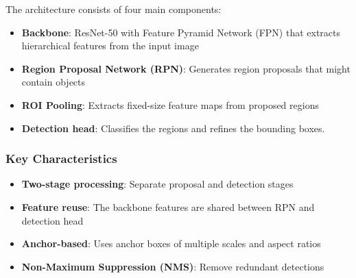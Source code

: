\documentclass[12pt,a4paper]{article}
\begin{document}
The architecture consists of four main components:
\begin{itemize}
    \item \textbf{Backbone}: ResNet-50 with Feature Pyramid Network (FPN) that extracts hierarchical features from the input image
    \item \textbf{Region Proposal Network (RPN)}: Generates region proposals that might contain objects
    \item \textbf{ROI Pooling}: Extracts fixed-size feature maps from proposed regions
    \item \textbf{Detection head}: Classifies the regions and refines the bounding boxes.
\end{itemize}

\subsubsection{Key Characteristics}
\begin{itemize}
    \item \textbf{Two-stage processing}: Separate proposal and detection stages
    \item \textbf{Feature reuse}: The backbone features are shared between RPN and detection head
    \item \textbf{Anchor-based}: Uses anchor boxes of multiple scales and aspect ratios
    \item \textbf{Non-Maximum Suppression (NMS)}: Remove redundant detections
\end{itemize}
\end{document}
